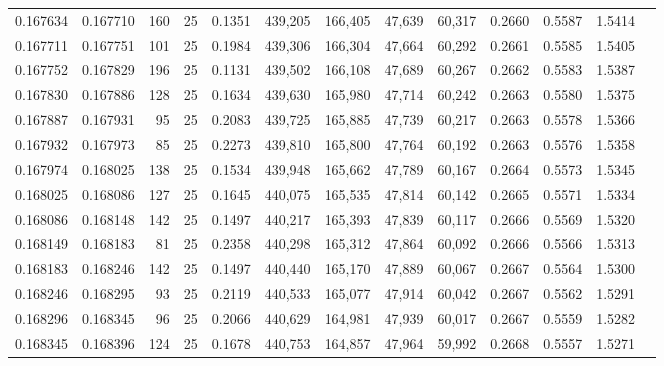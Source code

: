 \begin{tabular}{rrrrrrrrrrrrr}
0.167634 & 0.167710 &   160 &  25 &                                     0.1351 & 439,205 & 166,405 &  47,639 &  60,317 & 0.2660 & 0.5587 & 1.5414 \\
0.167711 & 0.167751 &   101 &  25 &                                     0.1984 & 439,306 & 166,304 &  47,664 &  60,292 & 0.2661 & 0.5585 & 1.5405 \\
0.167752 & 0.167829 &   196 &  25 &                                     0.1131 & 439,502 & 166,108 &  47,689 &  60,267 & 0.2662 & 0.5583 & 1.5387 \\
0.167830 & 0.167886 &   128 &  25 &                                     0.1634 & 439,630 & 165,980 &  47,714 &  60,242 & 0.2663 & 0.5580 & 1.5375 \\
0.167887 & 0.167931 &    95 &  25 &                                     0.2083 & 439,725 & 165,885 &  47,739 &  60,217 & 0.2663 & 0.5578 & 1.5366 \\
0.167932 & 0.167973 &    85 &  25 &                                     0.2273 & 439,810 & 165,800 &  47,764 &  60,192 & 0.2663 & 0.5576 & 1.5358 \\
0.167974 & 0.168025 &   138 &  25 &                                     0.1534 & 439,948 & 165,662 &  47,789 &  60,167 & 0.2664 & 0.5573 & 1.5345 \\
0.168025 & 0.168086 &   127 &  25 &                                     0.1645 & 440,075 & 165,535 &  47,814 &  60,142 & 0.2665 & 0.5571 & 1.5334 \\
0.168086 & 0.168148 &   142 &  25 &                                     0.1497 & 440,217 & 165,393 &  47,839 &  60,117 & 0.2666 & 0.5569 & 1.5320 \\
0.168149 & 0.168183 &    81 &  25 &                                     0.2358 & 440,298 & 165,312 &  47,864 &  60,092 & 0.2666 & 0.5566 & 1.5313 \\
0.168183 & 0.168246 &   142 &  25 &                                     0.1497 & 440,440 & 165,170 &  47,889 &  60,067 & 0.2667 & 0.5564 & 1.5300 \\
0.168246 & 0.168295 &    93 &  25 &                                     0.2119 & 440,533 & 165,077 &  47,914 &  60,042 & 0.2667 & 0.5562 & 1.5291 \\
0.168296 & 0.168345 &    96 &  25 &                                     0.2066 & 440,629 & 164,981 &  47,939 &  60,017 & 0.2667 & 0.5559 & 1.5282 \\
0.168345 & 0.168396 &   124 &  25 &                                     0.1678 & 440,753 & 164,857 &  47,964 &  59,992 & 0.2668 & 0.5557 & 1.5271 \\

\end{tabular}
